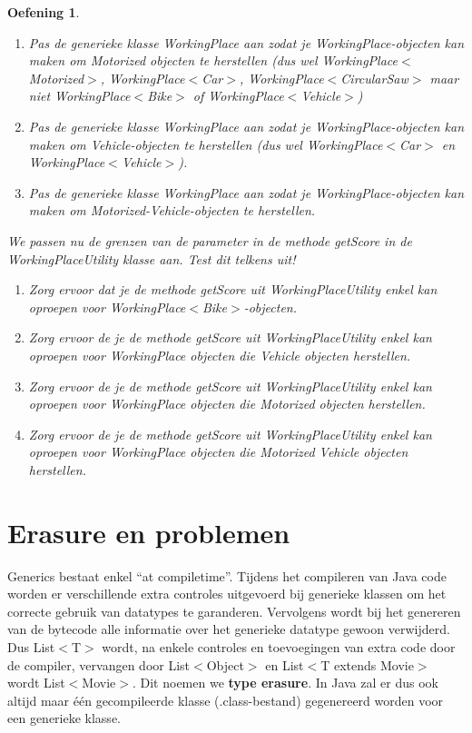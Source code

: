\documentclass{tstextbook}
\newtheorem{envoefening}{Oefening}[chapter]
\newenvironment{oefening}
               {\begin{boxexercise}\begin{envoefening}}
               {\end{envoefening}\end{boxexercise}}
\begin{document}
\begin{oefening}
\begin{enumerate}[label=(\alph*)]
\item Pas de generieke klasse WorkingPlace aan zodat je WorkingPlace-objecten kan maken om Motorized objecten te herstellen (dus wel WorkingPlace$<$Motorized$>$, WorkingPlace$<$Car$>$, WorkingPlace$<$CircularSaw$>$ maar niet WorkingPlace$<$Bike$>$ of WorkingPlace$<$Vehicle$>$)
\item Pas de generieke klasse WorkingPlace aan zodat je WorkingPlace-objecten kan maken om
Vehicle-objecten te herstellen (dus wel WorkingPlace$<$Car$>$ en WorkingPlace$<$Vehicle$>$).
\item Pas de generieke klasse WorkingPlace aan zodat je WorkingPlace-objecten kan maken om
Motorized-Vehicle-objecten te herstellen.
\end{enumerate}
We passen nu de grenzen van de parameter in de methode getScore in de WorkingPlaceUtility
klasse aan. Test dit telkens uit!
\begin{enumerate}[label=(\alph*)]
\item Zorg ervoor dat je de methode getScore uit WorkingPlaceUtility enkel kan oproepen voor
WorkingPlace$<$Bike$>$-objecten.
\item Zorg ervoor de je de methode getScore uit WorkingPlaceUtility enkel kan oproepen voor
WorkingPlace objecten die Vehicle objecten herstellen.
\item Zorg ervoor de je de methode getScore uit WorkingPlaceUtility enkel kan oproepen voor
WorkingPlace objecten die Motorized objecten herstellen.
\item  Zorg ervoor de je de methode getScore uit WorkingPlaceUtility enkel kan oproepen voor WorkingPlace objecten die Motorized Vehicle objecten herstellen. 
\end{enumerate}
\end{oefening}


\section{Erasure en problemen}

Generics bestaat enkel ``at compiletime''. 
Tijdens het compileren van Java code worden er verschillende extra controles uitgevoerd bij generieke klassen om het correcte gebruik van datatypes te garanderen. 
Vervolgens wordt bij het genereren van de bytecode alle informatie over het generieke datatype gewoon verwijderd. Dus List$<$T$>$ wordt, na enkele controles en toevoegingen van extra code door de compiler, vervangen door List$<$Object$>$ en List$<$T extends Movie$>$ wordt List$<$Movie$>$. Dit noemen we \textbf{type erasure}. In Java zal er dus ook altijd maar \'e\'en gecompileerde klasse (.class-bestand) gegenereerd worden voor een generieke klasse. 
\end{document}
